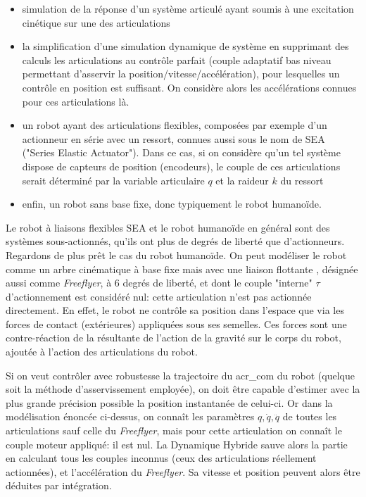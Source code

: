 \documentclass{report}
\begin{document}
\begin{itemize}
\item simulation de la réponse d'un système articulé ayant soumis à une excitation cinétique sur une des articulations
\item la simplification d'une simulation dynamique de système en supprimant des calculs les articulations au contrôle parfait (couple adaptatif bas niveau permettant d'asservir la position/vitesse/accélération), pour lesquelles un contrôle en position est suffisant. On considère alors les accélérations connues pour ces articulations là.
\item un robot ayant des articulations flexibles, composées par exemple d'un actionneur en série avec un ressort, connues aussi sous le nom de SEA ("Series Elastic Actuator"). Dans ce cas, si on considère qu'un tel système dispose de capteurs de position (encodeurs), le couple de ces articulations serait déterminé par la variable articulaire $q$ et la raideur $k$ du ressort
\item enfin, un robot sans base fixe, donc typiquement le robot humanoïde.
\end{itemize}

Le robot à liaisons flexibles SEA et le robot humanoïde en général sont des systèmes sous-actionnés, \cad qu'ils ont plus de degrés de liberté que d'actionneurs. Regardons de plus prêt le cas du robot humanoïde. On peut modéliser le robot comme un arbre cinématique à base fixe mais avec une liaison flottante \cite[chap.9 p171]{bib_featherstone}, désignée aussi comme \emph{Freeflyer}, à 6 degrés de liberté, et dont le couple "interne" $\tau$ d'actionnement est considéré nul: cette articulation n'est pas actionnée directement. En effet, le robot ne contrôle sa position dans l'espace que via les forces de contact (extérieures) appliquées sous ses semelles. Ces forces sont une contre-réaction de la résultante de l'action de la gravité sur le corps du robot, ajoutée à l'action des articulations du robot.

Si on veut contrôler avec robustesse la trajectoire du \gls{acr_com} du robot (quelque soit la méthode d'asservissement employée), on doit être capable d'estimer avec la plus grande précision possible la position instantanée de celui-ci. Or dans la modélisation énoncée ci-dessus, on connaît les paramètres $q, \dot{q}, \ddot{q}$ de toutes les articulations sauf celle du \emph{Freeflyer}, mais pour cette articulation on connaît le couple moteur appliqué: il est nul. La Dynamique Hybride sauve alors la partie en calculant tous les couples inconnus (ceux des articulations réellement actionnées), et l'accélération du \emph{Freeflyer}. Sa vitesse et position peuvent alors être déduites par intégration.
\end{document}
